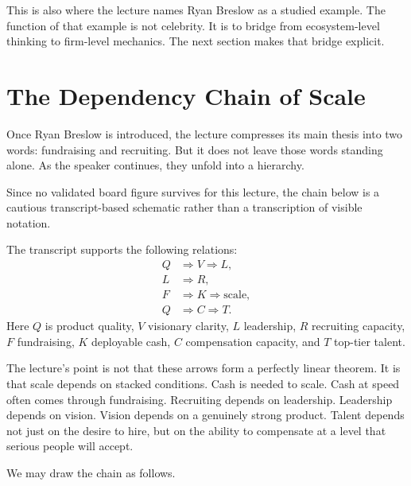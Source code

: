 This is also where the lecture names Ryan Breslow as a studied example. The function of that example is not celebrity. It is to bridge from ecosystem-level thinking to firm-level mechanics. The next section makes that bridge explicit.

\section{The Dependency Chain of Scale}

Once Ryan Breslow is introduced, the lecture compresses its main thesis into two words: fundraising and recruiting. But it does not leave those words standing alone. As the speaker continues, they unfold into a hierarchy.

\begin{remark}
Since no validated board figure survives for this lecture, the chain below is a cautious transcript-based schematic rather than a transcription of visible notation.
\end{remark}

The transcript supports the following relations:
\begin{align}
Q &\Rightarrow V \Rightarrow L,\\
L &\Rightarrow R,\\
F &\Rightarrow K \Rightarrow \text{scale},\\
Q &\Rightarrow C \Rightarrow T.
\end{align}
Here $Q$ is product quality, $V$ visionary clarity, $L$ leadership, $R$ recruiting capacity, $F$ fundraising, $K$ deployable cash, $C$ compensation capacity, and $T$ top-tier talent.

The lecture's point is not that these arrows form a perfectly linear theorem. It is that scale depends on stacked conditions. Cash is needed to scale. Cash at speed often comes through fundraising. Recruiting depends on leadership. Leadership depends on vision. Vision depends on a genuinely strong product. Talent depends not just on the desire to hire, but on the ability to compensate at a level that serious people will accept.

We may draw the chain as follows.

